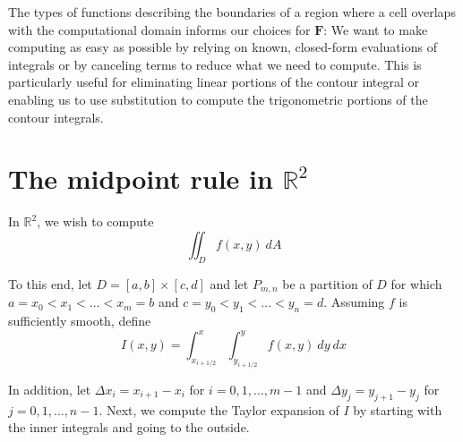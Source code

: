 \documentclass{article}
\begin{document}
\noindent
The types of functions describing the boundaries of a region where a cell overlaps with the computational domain informs our choices for $\mathbf{F}$: We want to make computing as easy as possible by relying on known, closed-form evaluations of integrals or by canceling terms to reduce what we need to compute. This is particularly useful for eliminating linear portions of the contour integral or enabling us to use substitution to compute the trigonometric portions of the contour integrals.

\newpage

\section{The midpoint rule in $\mathbb{R}^2$}

In $\mathbb{R}^2$, we wish to compute
\[
    \iint_D f(x,y) \: dA
\]

\noindent
To this end, let $D = [a,b] \times [c, d]$ and let $P_{m,n}$ be a partition of $D$ for which $a = x_0 < x_1 < \ldots < x_m = b$ and $c = y_0 < y_1 < \ldots < y_n = d$. Assuming $f$ is sufficiently smooth, define
\[
    I(x,y)
    =
    \int_{x_{i+1/2}}^x
    \int_{y_{i+1/2}}^y
    f(x,y)
    \: dy \: dx
\]

\noindent
In addition, let $\Delta x_i = x_{i+1} - x_i$ for $i = 0, 1, \ldots, m - 1$ and $\Delta y_j = y_{j+1} - y_j$ for $j = 0, 1, \ldots, n - 1$. Next, we compute the Taylor expansion of $I$ by starting with the inner integrals and going to the outside.
\end{document}
